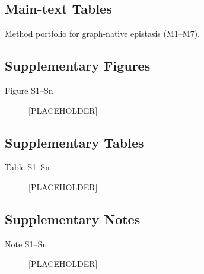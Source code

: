 \documentclass[pdflatex,sn-nature]{sn-jnl}
\begin{document}
\subsection*{Main-text Tables}
\begin{description}
\setlength{\itemsep}{2pt}
\item[Table 1] [PLACEHOLDER] Method portfolio for graph-native epistasis (M1--M7).
\end{description}

\subsection*{Supplementary Figures} \begin{description}\item [Figure S1--Sn] [PLACEHOLDER]\end{description}
\subsection*{Supplementary Tables} \begin{description}\item [Table S1--Sn] [PLACEHOLDER]\end{description}
\subsection*{Supplementary Notes} \begin{description}\item [Note S1--Sn] [PLACEHOLDER]\end{description}

\clearpage


\end{document}
